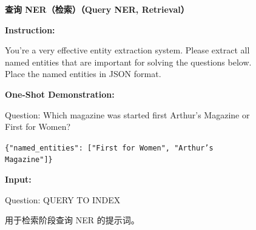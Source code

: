 \documentclass[11pt,UTF8,fontset=fandol]{ctexart}
\begin{document}
\begin{figure}[H]\centering
\begin{tcolorbox}[colback=white,colframe=black!55,boxrule=0.5pt,left=4pt,right=4pt,top=3pt,bottom=3pt,width=\linewidth]
\begin{center}\textbf{查询 NER（检索）（Query NER, Retrieval）}\end{center}
\small
\textbf{Instruction:}

You're a very effective entity extraction system. Please extract all named entities that are important for solving the questions below. Place the named entities in JSON format.

\textbf{One-Shot Demonstration:}

Question: Which magazine was started first Arthur's Magazine or First for Women?

\texttt{\{"named\_entities": ["First for Women", "Arthur's Magazine"]\}}

\textbf{Input:}

Question: QUERY TO INDEX
\end{tcolorbox}
\caption{用于检索阶段查询 NER 的提示词。}
\label{fig:8}
\end{figure}
\end{document}
